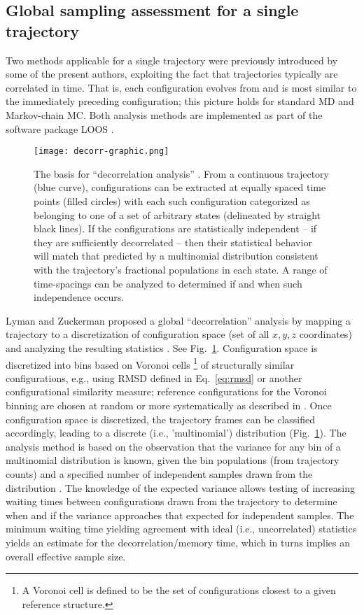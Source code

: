\subsection{Global sampling assessment for a single trajectory}
Two methods applicable for a single trajectory were previously introduced by some of the present authors, exploiting the fact that trajectories typically are correlated in time.
That is, each configuration evolves from and is most similar to the immediately preceding configuration;
this picture holds for standard MD and Markov-chain MC.
Both analysis methods are implemented as part of the software package LOOS \cite{LOOS,LOOS-JCC}.

\begin{figure}
  \centering
  \texttt{[image: decorr-graphic.png]}
  \caption{The basis for ``decorrelation analysis'' \cite{Lyman2007a}.
  From a continuous trajectory (blue curve), configurations can be extracted at equally spaced time points (filled circles) with each such configuration categorized as belonging to one of a set of arbitrary states (delineated by straight black lines).  
  If the configurations are statistically independent -- if they are sufficiently decorrelated -- then their statistical behavior will match that predicted by a multinomial distribution consistent with the trajectory's fractional populations in each state.
  A range of time-spacings can be analyzed to determined if and when such independence occurs.}
  \label{fig:decorr}
\end{figure}

Lyman and Zuckerman proposed a global ``decorrelation'' analysis by mapping a trajectory to a discretization of configuration space (set of all $x, y, z$ coordinates) and analyzing the resulting statistics \cite{Lyman2007a}.
See Fig.\ \ref{fig:decorr}.
Configuration space is discretized into bins based on Voronoi cells \footnote{A Voronoi cell is defined to be the set of configurations closest to a given reference structure.} of structurally similar configurations,  e.g., using RMSD defined in Eq.\ \ref{eq:rmsd} or another configurational similarity measure; reference configurations for the Voronoi binning are chosen at random or more systematically as described in \cite{Lyman2007a}.
Once configuration space is discretized, the trajectory frames can be classified accordingly, leading to a discrete (i.e., 'multinomial') distribution (Fig.\ \ref{fig:decorr}).
The analysis method is based on the observation that the variance for any bin of a multinomial distribution is known, given the bin populations (from trajectory counts) and a specified number of independent samples drawn from the distribution \cite{Lyman2007a}.
The knowledge of the expected variance allows testing of increasing waiting times between configurations drawn from the trajectory to determine when and if the variance approaches that expected for independent samples.
The minimum waiting time yielding agreement with ideal (i.e., uncorrelated) statistics yields an estimate for the decorrelation/memory time, which in turns implies an overall effective sample size. 



